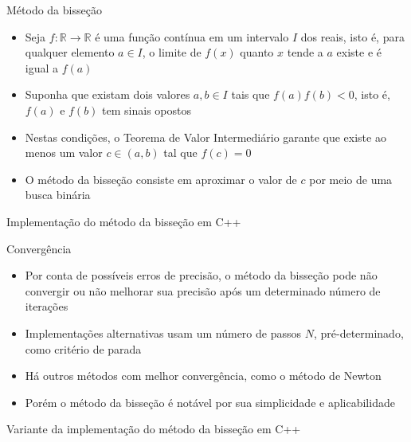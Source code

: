\begin{frame}[fragile]{Método da bisseção}

    \begin{itemize}
        \item Seja $f: \mathbb{R}\to \mathbb{R}$ é uma função contínua em um intervalo $I$ dos reais, isto é, para qualquer elemento $a\in I$, o limite de $f(x)$ quanto $x$ tende a $a$ existe e é igual a $f(a)$

        \item Suponha que existam dois valores $a, b\in I$ tais que $f(a)f(b) < 0$, isto é, $f(a)$ e $f(b)$ tem sinais opostos

        \item Nestas condições, o Teorema de Valor Intermediário garante que existe ao menos um valor $c \in (a,b)$ tal que $f(c) = 0$

        \item O método da bisseção consiste em aproximar o valor de $c$ por meio de uma busca binária
    \end{itemize}

\end{frame}

\begin{frame}[fragile]{Implementação do método da bisseção em C++}
\end{frame}

\begin{frame}[fragile]{Convergência}

    \begin{itemize}
        \item Por conta de possíveis erros de precisão, o método da bisseção pode não convergir ou não melhorar sua precisão após um determinado número de iterações 
        \item Implementações alternativas usam um número de passos $N$, pré-determinado, como critério de parada

        \item Há outros métodos com melhor convergência, como o método de Newton

        \item Porém o método da bisseção é notável por sua simplicidade e aplicabilidade
    \end{itemize}

\end{frame}

\begin{frame}[fragile]{Variante da implementação do método da bisseção em C++}
\end{frame}

